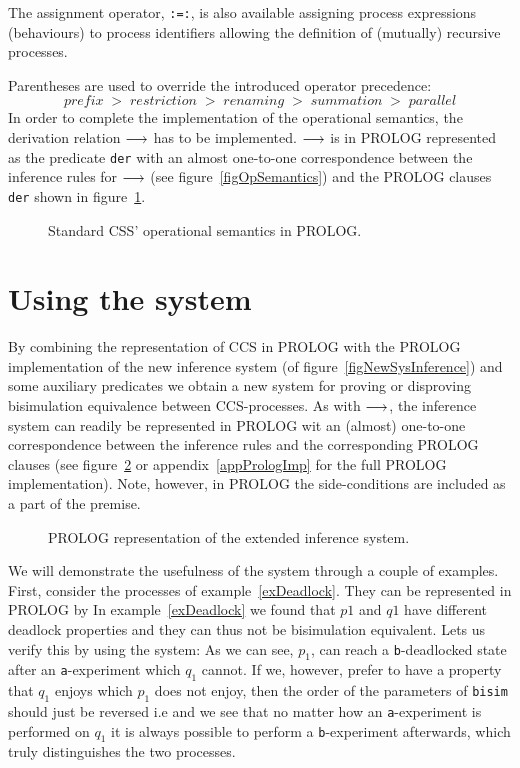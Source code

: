 The assignment operator, {\tt :=:}, is also available assigning process expressions (behaviours) to process identifiers allowing the definition of (mutually) recursive processes.

\noindent
Parentheses are used to override the introduced operator precedence:
\[
prefix\;>\;restriction\;>\;renaming\;>\;summation\;>\;parallel
\]
In order to complete the implementation of the operational semantics, the derivation relation $\stackrel{}{\longrightarrow}$ has to be implemented. $\stackrel{}{\longrightarrow}$ is in PROLOG represented as the predicate {\tt der} with an almost one-to-one correspondence between the inference rules for $\stackrel{}{\longrightarrow}$ (see figure~\ref{figOpSemantics}) and the PROLOG clauses {\tt der} shown in figure~\ref{figPrologDer}.
\begin{figure}
\caption{Standard CSS' operational semantics in PROLOG.\label{figPrologDer}}
\end{figure}

\section{Using the system}
By combining the representation of CCS in PROLOG with the PROLOG implementation of the new inference system (of figure~\ref{figNewSysInference}) and some auxiliary predicates we obtain a new system for proving or disproving bisimulation equivalence between CCS-processes. As with $\stackrel{}{\longrightarrow}$, the inference system can readily be represented in PROLOG wit an (almost) one-to-one correspondence between the inference rules and the corresponding PROLOG clauses (see figure~\ref{figPrologInf} or appendix~\ref{appPrologImp} for the full PROLOG implementation). Note, however, in PROLOG the side-conditions are included as a part of the premise.
\begin{figure}
%
\caption{PROLOG representation of the extended inference system.\label{figPrologInf}}
\end{figure}

\noindent
We will demonstrate the usefulness of the system through a couple of examples. First, consider the processes of example~\ref{exDeadlock}. They can be represented in PROLOG by
%
In example~\ref{exDeadlock} we found that $p1$ and $q1$ have different deadlock properties and they can thus not be bisimulation equivalent. Lets us verify this by using the system:
%
As we can see, $p_1$, can reach a \verb!b!-deadlocked state after an \verb!a!-experiment which $q_1$ cannot. If we, however, prefer to have a property that $q_1$ enjoys which $p_1$ does not enjoy, then the order of the parameters of 
\verb!bisim! should just be reversed i.e\@
{}%
and we see that no matter how an \verb!a!-experiment is performed on $q_1$ it is always possible to perform a \verb!b!-experiment afterwards, which truly distinguishes the two processes.

